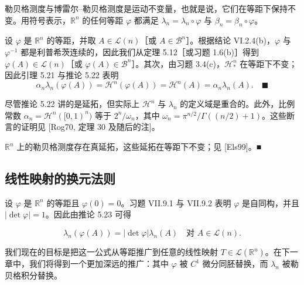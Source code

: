 \begin{corollary}

勒贝格测度与博雷尔–勒贝格测度是运动不变量，也就是说，它们在等距下保持不变。用符号表示，$ \mathbb{R}^n $ 的任何等距 $ \varphi $ 都满足 $ \lambda_n = \lambda_n \circ \varphi $ 与 $ \beta_n = \beta_n \circ \varphi $。

\proofhead
设 $ \varphi $ 是 $ \mathbb{R}^n $ 的等距，并取 $ A \in \mathcal{L}(n) $［或 $ A \in \mathcal{B}^n $］。根据结论 VI.2.4(b)，$ \varphi $ 与 $ \varphi^{-1} $ 都是利普希茨连续的，因此我们从定理 5.12［或习题 1.6(b)］得到 $ \varphi(A) \in \mathcal{L}(n) $［或 $ \varphi(A) \in \mathcal{B}^n $］。其次，由习题 3.4(c)，$ \mathcal{H}^n_* $ 在等距下不变；因此引理 5.21 与推论 5.22 表明
\[
\alpha_n \lambda_n(\varphi(A)) = \mathcal{H}^n(\varphi(A)) = \mathcal{H}^n(A) = \alpha_n \lambda_n(A) .\quad\blacksquare
\]
\end{corollary}

\begin{remark}

\begin{items}
\item

尽管推论 5.22 讲的是延拓，但实际上 $ \mathcal{H}^n $ 与 $ \lambda_n $ 的定义域是重合的。此外，比例常数 $ \alpha_n = \mathcal{H}^n([0, 1)^n) $ 等于 $ 2^n/\omega_n $，其中 $ \omega_n = \pi^{n/2}/\Gamma((n/2) + 1) $。这些断言的证明见 [Rog70, 定理 30 及随后的注]。

\item

$ \mathbb{R}^n $ 上的勒贝格测度存在真延拓，这些延拓在等距下不变；见 [Els99]。\nobreak\hspace{0.35em}■

\end{items}

\end{remark}

\subsection*{线性映射的换元法则}

设 $ \varphi $ 是 $ \mathbb{R}^n $ 的等距且 $ \varphi(0) = 0 $。习题 VII.9.1 与 VII.9.2 表明 $ \varphi $ 是自同构，并且 $ |\det \varphi| = 1 $。因此由推论 5.23 可得

\[
\lambda_n(\varphi(A)) = |\det \varphi| \lambda_n(A) \quad \text{对 } A \in \mathcal{L}(n) .
\]

我们现在的目标是把这一公式从等距推广到任意的线性映射 $ T \in \mathcal{L}(\mathbb{R}^n) $。在下一章中，我们将得到一个更加深远的推广：其中 $ \varphi $ 被 $ C^1 $ 微分同胚替换，而 $ \lambda_n $ 被勒贝格积分替换。


